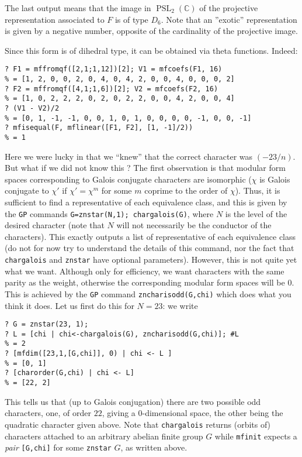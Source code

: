 \documentclass[11pt]{article}
\DeclareMathOperator{\PSL}{PSL}
\newcommand{\C}{{\mathbb C}}
\def\kbd#1{{\tt #1}}
\begin{document}
The last output means that the image in $\PSL_2(\C)$ of the projective
representation associated to $F$ is of type $D_6$. Note that an ''exotic''
representation is given by a negative number, opposite of the cardinality
of the projective image.

Since this form is of dihedral type, it can be obtained via theta functions.
Indeed:

\begin{verbatim}
? F1 = mffromqf([2,1;1,12])[2]; V1 = mfcoefs(F1, 16)
% = [1, 2, 0, 0, 2, 0, 4, 0, 4, 2, 0, 0, 4, 0, 0, 0, 2]
? F2 = mffromqf([4,1;1,6])[2]; V2 = mfcoefs(F2, 16)
% = [1, 0, 2, 2, 2, 0, 2, 0, 2, 2, 0, 0, 4, 2, 0, 0, 4]
? (V1 - V2)/2
% = [0, 1, -1, -1, 0, 0, 1, 0, 1, 0, 0, 0, 0, -1, 0, 0, -1]
? mfisequal(F, mflinear([F1, F2], [1, -1]/2))
% = 1
\end{verbatim}

Here we were lucky in that we ``knew'' that the correct character was
$(-23/n)$. But what if we did not know this ? The first observation is
that modular form spaces corresponding to Galois conjugate characters
are isomorphic ($\chi$ is Galois conjugate to $\chi'$ if $\chi'=\chi^m$
for some $m$ coprime to the order of $\chi$). Thus, it is sufficient
to find a representative of each equivalence class, and this is given by
the \kbd{GP} commands \kbd{G=znstar(N,1); chargalois(G)}, where $N$ is the
level of the desired character (note that $N$ will not necessarily be
the conductor of the characters). This exactly outputs a list of representative
of each equivalence class (do not for now try to understand the details of
this command, nor the fact that \kbd{chargalois} and \kbd{znstar} have
optional parameters). However, this is not quite yet what we want.
Although only for efficiency, we want characters with the same parity
as the weight, otherwise the corresponding modular form spaces will be $0$.
This is achieved by the \kbd{GP} command \kbd{zncharisodd(G,chi)} which
does what you think it does. Let us first do this for $N=23$: we write
\begin{verbatim}
? G = znstar(23, 1);
? L = [chi | chi<-chargalois(G), zncharisodd(G,chi)]; #L
% = 2
? [mfdim([23,1,[G,chi]], 0) | chi <- L ]
% = [0, 1]
? [charorder(G,chi) | chi <- L]
% = [22, 2]
\end{verbatim}

This tells us that (up to Galois conjugation) there are two possible odd
characters, one, of order $22$, giving a $0$-dimensional space, the other
being the quadratic character given above. Note that \kbd{chargalois}
returns (orbits of) characters attached to an arbitrary abelian finite group
$G$ while \kbd{mfinit} expects a \emph{pair} \kbd{[G,chi]} for some
\kbd{znstar} $G$, as written above.
\end{document}
